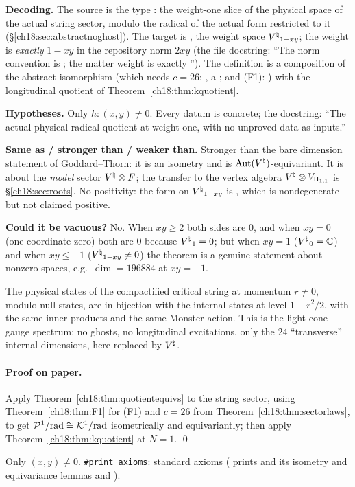 \begin{dictionary}
\textbf{Decoding.}  The source is the type : the weight-one slice of
the physical space of the actual string sector, modulo the radical of the actual form restricted to it
(\S\ref{ch18:sec:abstractnoghost}).  The target is , the weight space
${V^{\natural}}_{1-xy}$; the weight is \emph{exactly} $1-xy$ in the repository norm $2xy$ (the file docstring:
``The norm convention is ; the matter weight is exactly '').  The definition is a
composition of the abstract isomorphism  (which needs $c=26$:
, a ; and (F1): ) with the
longitudinal quotient of Theorem~\ref{ch18:thm:kquotient}.

\textbf{Hypotheses.}  Only $h:(x,y)\neq0$.  Every datum is concrete; the docstring: ``The actual physical
radical quotient at weight one, with no unproved data as inputs.''

\textbf{Same as / stronger than / weaker than.}  Stronger than the bare dimension statement of
Goddard--Thorn: it is an isometry and is $\operatorname{Aut}({V^{\natural}})$-equivariant.  It is about the \emph{model} sector
${V^{\natural}}\otimes F$; the transfer to the vertex algebra ${V^{\natural}}\otimes V_{\mathrm{II}_{1,1}}$ is
\S\ref{ch18:sec:roots}.  No positivity: the form on ${V^{\natural}}_{1-xy}$ is , which is nondegenerate
but not claimed positive.

\textbf{Could it be vacuous?}  No.  When $xy\ge2$ both sides are $0$, and when $xy=0$ (one coordinate zero) both are
$0$ because ${V^{\natural}}_1=0$; but when $xy=1$ (${V^{\natural}}_0=\mathbb C$) and when $xy\le-1$ (${V^{\natural}}_{1-xy}\neq0$) the theorem is a genuine
statement about nonzero spaces, e.g.\ $\dim=196884$ at $xy=-1$.
\end{dictionary}
\begin{physics}
The physical states of the compactified critical string at momentum $r\neq0$, modulo null states, are
in bijection with the internal states at level $1-r^2/2$, with the same inner products and the same
Monster action.  This is the light-cone gauge spectrum: no ghosts, no longitudinal excitations, only
the $24$ ``transverse'' internal dimensions, here replaced by ${V^{\natural}}$.
\end{physics}
\paragraph{Proof on paper.}  Apply Theorem~\ref{ch18:thm:quotientequivs} to the string sector, using
Theorem~\ref{ch18:thm:F1} for (F1) and $c=26$ from Theorem~\ref{ch18:thm:sectorlaws}, to get
$\mathcal{P}^1/\mathrm{rad}\cong\mathcal{K}^1/\mathrm{rad}$ isometrically and equivariantly; then apply Theorem~\ref{ch18:thm:kquotient} at
$N=1$. \qed
\begin{status}
Only $(x,y)\neq0$.  \texttt{\#print axioms}: standard axioms (
prints  and its isometry and equivariance lemmas and
).
\end{status}

